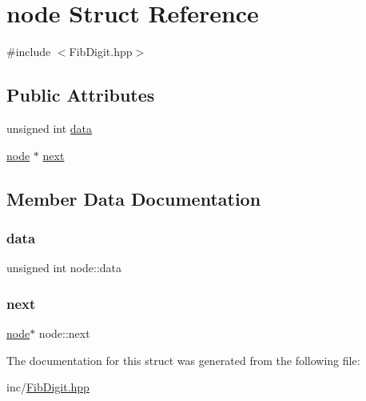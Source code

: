 \hypertarget{structnode}{}\section{node Struct Reference}
\label{structnode}


{\ttfamily \#include $<$Fib\+Digit.\+hpp$>$}

\subsection*{Public Attributes}
\begin{DoxyCompactItemize}
\item 
unsigned int \mbox{\hyperlink{structnode_acf4025b7fd2efff5a6be76b9e99213b1}{data}}
\item 
\mbox{\hyperlink{structnode}{node}} $\ast$ \mbox{\hyperlink{structnode_aad210fa7c160a49f6b9a3ffee592a2bc}{next}}
\end{DoxyCompactItemize}


\subsection{Member Data Documentation}
\mbox{\label{structnode_acf4025b7fd2efff5a6be76b9e99213b1}} 
\subsubsection{\texorpdfstring{data}{data}}
{\footnotesize\ttfamily unsigned int node\+::data}

\mbox{\label{structnode_aad210fa7c160a49f6b9a3ffee592a2bc}} 
\subsubsection{\texorpdfstring{next}{next}}
{\footnotesize\ttfamily \mbox{\hyperlink{structnode}{node}}$\ast$ node\+::next}



The documentation for this struct was generated from the following file\+:\begin{DoxyCompactItemize}
\item 
inc/\mbox{\hyperlink{FibDigit_8hpp}{Fib\+Digit.\+hpp}}\end{DoxyCompactItemize}
